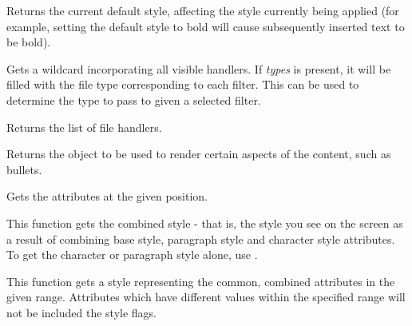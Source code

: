 
Returns the current default style, affecting the style currently being applied (for example, setting the default
style to bold will cause subsequently inserted text to be bold).

\label{wxrichtextbuffergetextwildcard}


Gets a wildcard incorporating all visible handlers. If {\it types} is present,
it will be filled with the file type corresponding to each filter. This can be
used to determine the type to pass to  given a selected filter.

\label{wxrichtextbuffergethandlers}


Returns the list of file handlers.

\label{wxrichtextbuffergetrenderer}


Returns the object to be used to render certain aspects of the content, such as bullets.

\label{wxrichtextbuffergetstyle}



Gets the attributes at the given position.

This function gets the combined style - that is, the style you see on the screen as a result
of combining base style, paragraph style and character style attributes. To get the character
or paragraph style alone, use .

\label{wxrichtextbuffergetstyleforrange}


This function gets a style representing the common, combined attributes in the given range.
Attributes which have different values within the specified range will not be included the style
flags.

